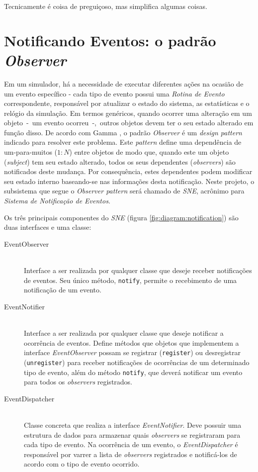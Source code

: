 Tecnicamente é coisa de preguiçoso, mas simplifica algumas coisas.

\section{\label{sec:model:notify}Notificando Eventos: o padrão
\textit{Observer}}

Em um simulador, há a necessidade de executar diferentes ações na ocasião de um
evento específico - cada tipo de evento possui uma \textit{Rotina de Evento}
correspondente, responsável por atualizar o estado do sistema, as estatísticas e
o relógio da simulação. Em termos genéricos, quando ocorrer uma alteração em um
objeto~-~um evento ocorreu~-,~outros objetos devem ter o seu estado alterado em
função disso. De acordo com Gamma \cite{Gamma:1995:DPE:186897}, o padrão
\textit{Observer} é um \textit{design pattern} indicado para resolver este
problema. Este \textit{pattern} define uma dependência de um-para-muitos ($1:N$)
entre objetos de modo que, quando este um objeto (\textit{subject}) tem seu
estado alterado, todos os seus dependentes (\textit{observers}) são notificados
deste mudança. Por consequência, estes dependentes podem modificar seu estado
interno baseando-se nas informações desta notificação. Neste projeto, o
subsistema que segue o \textit{Observer pattern} será chamado de \textit{SNE},
acrônimo para \textit{Sistema de Notificação de Eventos}.

Os três principais componentes do \textit{SNE} (figura
\ref{fig:diagram:notification}) são duas interfaces e uma classe:

\begin{description}
  \item[EventObserver] \hfill \\
    Interface a ser realizada por qualquer classe que deseje receber
    notificações de eventos. Seu único método, \texttt{notify}, permite o
    recebimento de uma notificação de um evento.

  \item[EventNotifier] \hfill \\
    Interface a ser realizada por qualquer classe que deseje notificar a
    ocorrência de eventos. Define métodos que objetos que implementem a
    interface \textit{EventObserver} possam se registrar (\texttt{register}) ou
    desregistrar (\texttt{unregister}) para receber notificações de ocorrências
    de um determinado tipo de evento, além do método \texttt{notify}, que deverá
    notificar um evento para todos os \textit{observers} registrados.

\item[EventDispatcher] \hfill \\
    Classe concreta que realiza a interface \textit{EventNotifier}. Deve possuir
    uma estrutura de dados para armazenar quais \textit{observers} se
    registraram para cada tipo de evento. Na ocorrência de um evento, o
    \textit{EventDispatcher} é responsável por varrer a lista de
    \textit{observers} registrados e notificá-los de acordo com o tipo de evento
    ocorrido.

\end{description}

